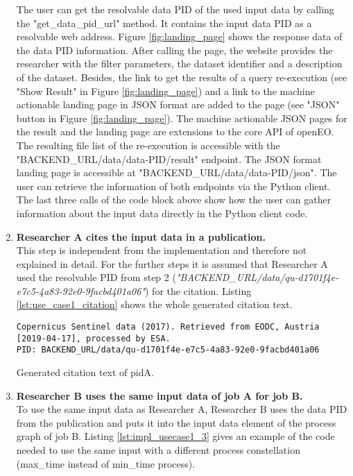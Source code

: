 \documentclass[draft,final]{vutinfth} %
\newenvironment{code}{\captionsetup{type=listing}}{}
\newcommand{\bgoesswein}[1]{{\color{blue}#1}}
\begin{document}
\begin{enumerate}
	\bgoesswein{The user can get the resolvable data PID of the used input data by calling the "get\_data\_pid\_url" method. It contains the input data PID as a resolvable web address.} Figure \ref{fig:landing_page} shows the response data of the data PID information. After calling the page, the website provides the researcher with the filter parameters, the dataset identifier and a description of the dataset. Besides, the link to get the results of a query re-execution (see "Show Result" in Figure \ref{fig:landing_page}) and \bgoesswein{a link to the machine actionable landing page in JSON format} are added to the page (see "JSON" button in Figure \ref{fig:landing_page}). \bgoesswein{The machine actionable JSON pages for the result and the landing page are extensions to the core API of openEO. The resulting file list of the re-execution is accessible with the "BACKEND\_URL/data/data-PID/result" endpoint. The JSON format landing page is accessible at "BACKEND\_URL/data/data-PID/json". The user can retrieve the information of both endpoints via the Python client.}   \\
	The last three calls of the code block above show how the user can gather information about the input data directly in the Python client code.
	\item \textbf{Researcher A cites the input data in a publication.} \\
	This step is independent from the implementation and therefore not explained in detail. For the further steps it is assumed that Researcher A used the resolvable PID from step 2 (\textit{"BACKEND\_URL/data/qu-d1701f4e-e7c5-4a83-92e0-9facbd401a06"}) for the citation. \bgoesswein{Listing \ref{lst:use_case1_citation} shows the whole generated citation text.}
\newpage
\begin{code}
	\begin{verbatim}
Copernicus Sentinel data (2017). Retrieved from EODC, Austria 
[2019-04-17], processed by ESA. 
PID: BACKEND_URL/data/qu-d1701f4e-e7c5-4a83-92e0-9facbd401a06
	\end{verbatim}
	\caption{Generated citation text of pidA.}
	\label{lst:use_case1_citation}
\end{code}

	 
	\item \textbf{Researcher B uses the same input data of job A for job B.} \\
	To use the same input data as Researcher A, Researcher B uses the data PID from the publication and puts it into the input data element of the process graph of job B. Listing \ref{lst:impl_usecase1_3} gives an example of the code needed to use the same input with a different process constellation (max\_time instead of min\_time process).  


\end{enumerate}
\end{document}
